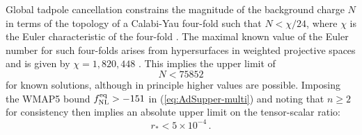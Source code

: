 Global tadpole cancellation constrains the magnitude of
the background charge $N$ in terms of the topology of 
a Calabi-Yau four-fold such that $N < \chi /
24$, where $\chi$ is the Euler characteristic of the four-fold
\cite{witten1,witten2,witten3,sethi,gkp,klemm}. 
The  maximal known value of the Euler number for such four-folds arises from 
hypersurfaces in weighted projective spaces and is given by 
$\chi = 1, 820,448$ \cite{klemm}. This implies the upper limit of 
% 
\begin{equation}
\label{eq:Nlimit-multi} 
N < 75852
\end{equation}
% 
for known solutions, although in principle higher values are possible. 
Imposing the WMAP5 bound $f_{\mathrm{NL}}^{\mathrm{eq}}>-151$ in (\ref{eq:AdSupper-multi})
and noting that $n \ge 2$ for consistency then implies an absolute
upper limit 
on the tensor-scalar ratio:
%  
\begin{equation}
\label{eq:rupper-multi}
r_* < 5 \times 10^{-4} \, .
\end{equation}
% 


